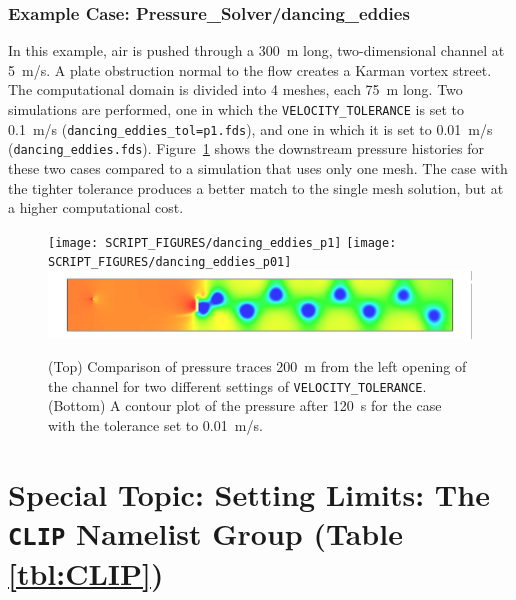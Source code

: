 \documentclass[11pt]{book}
\newcommand{\ct}{\tt\small}
\begin{document}
\subsubsection{Example Case: Pressure\_Solver/dancing\_eddies}

In this example, air is pushed through a 300~m long, two-dimensional channel at 5~m/s. A plate obstruction normal to the flow creates a Karman vortex street. The computational
domain is divided into 4 meshes, each 75~m long. Two simulations are performed, one in which the {\ct VELOCITY\_TOLERANCE} is set to 0.1~m/s ({\ct dancing\_eddies\_tol=p1.fds}), and one
in which it is set to 0.01~m/s ({\ct dancing\_eddies.fds}). Figure~\ref{dancing_eddies} shows the downstream pressure histories for these two cases compared to a simulation that uses only one mesh. The case with the tighter tolerance produces a better match to the single mesh solution, but at a higher computational cost.

\begin{figure}[ht]
\begin{center}
\texttt{[image: SCRIPT\_FIGURES/dancing\_eddies\_p1]}
\texttt{[image: SCRIPT\_FIGURES/dancing\_eddies\_p01]}
\includegraphics[width=\textwidth]{SCRIPT_FIGURES/dancing_eddies}
\end{center}
\caption[Results of the dancing eddies test case.]{(Top) Comparison of pressure traces 200~m from the left opening of the channel for two different settings
of {\ct VELOCITY\_TOLERANCE}. (Bottom) A contour plot of the pressure after 120~s for the case with the tolerance set to 0.01~m/s.}
\label{dancing_eddies}
\end{figure}



\clearpage

\section{Special Topic: Setting Limits: The \texorpdfstring{{\tt CLIP}}{CLIP} Namelist Group (Table \ref{tbl:CLIP})}
\label{info:CLIP}
\end{document}
